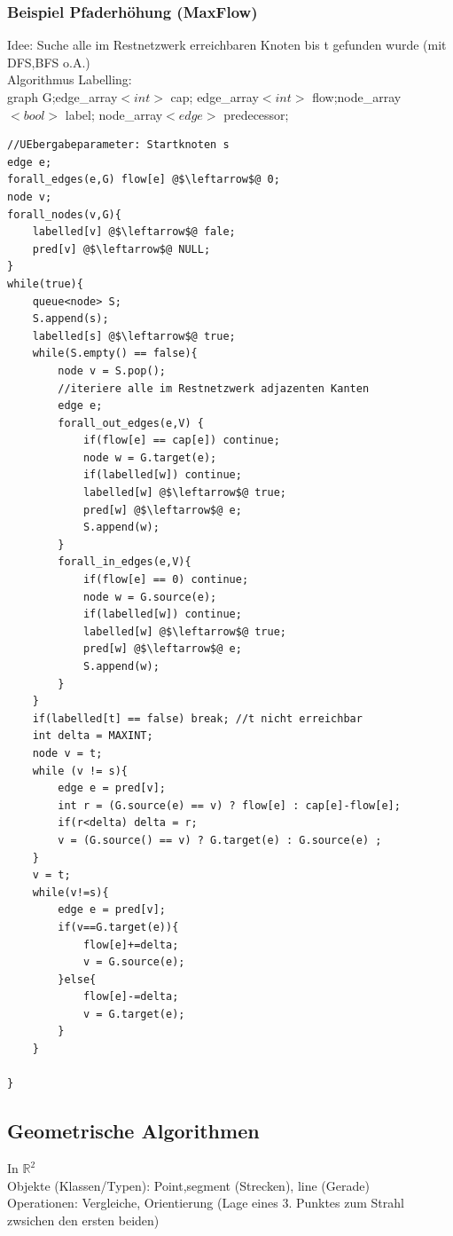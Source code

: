 \documentclass[a4paper]{article}
\begin{document}
\subsubsection*{Beispiel Pfaderhöhung (MaxFlow)}
Idee: Suche alle im Restnetzwerk erreichbaren Knoten bis t gefunden wurde (mit DFS,BFS o.A.)\\
Algorithmus Labelling:\\
\hspace*{1cm} graph G;edge\_array$<int>$ cap; edge\_array$<int>$ flow;node\_array$<bool>$ label; node\_array$<edge>$ predecessor;\\
\begin{lstlisting}[escapechar=@]
//UEbergabeparameter: Startknoten s
edge e;
forall_edges(e,G) flow[e] @$\leftarrow$@ 0;
node v;
forall_nodes(v,G){
	labelled[v] @$\leftarrow$@ fale;
	pred[v] @$\leftarrow$@ NULL;
}
while(true){
	queue<node> S;
	S.append(s);
	labelled[s] @$\leftarrow$@ true;
	while(S.empty() == false){
		node v = S.pop();
		//iteriere alle im Restnetzwerk adjazenten Kanten
		edge e;
		forall_out_edges(e,V) {
			if(flow[e] == cap[e]) continue;
			node w = G.target(e);
			if(labelled[w]) continue;
			labelled[w] @$\leftarrow$@ true;
			pred[w] @$\leftarrow$@ e;
			S.append(w);
		}
		forall_in_edges(e,V){
			if(flow[e] == 0) continue;
			node w = G.source(e);
			if(labelled[w]) continue;
			labelled[w] @$\leftarrow$@ true;
			pred[w] @$\leftarrow$@ e;
			S.append(w);
		}
	}
	if(labelled[t] == false) break; //t nicht erreichbar
	int delta = MAXINT;
	node v = t;
	while (v != s){
		edge e = pred[v];
		int r = (G.source(e) == v) ? flow[e] : cap[e]-flow[e];
		if(r<delta) delta = r;
		v = (G.source() == v) ? G.target(e) : G.source(e) ;
	}
	v = t;
	while(v!=s){
		edge e = pred[v];
		if(v==G.target(e)){
			flow[e]+=delta;
			v = G.source(e);
		}else{
			flow[e]-=delta;
			v = G.target(e);
		}
	}
		
}
\end{lstlisting}
\subsection*{Geometrische Algorithmen}
In $\mathbb{R}^2$\\
Objekte (Klassen/Typen): Point,segment (Strecken), line (Gerade)\\
Operationen: Vergleiche, Orientierung (Lage eines 3. Punktes zum Strahl zwsichen den ersten beiden)
\end{document}
